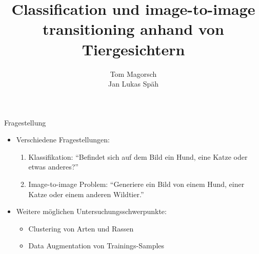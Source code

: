 \documentclass[aspectratio=1610, 9pt]{beamer}
\title{Classification und image-to-image transitioning anhand von Tiergesichtern}
\author[T.~Magorsch,~J.~L.~Späh]{Tom Magorsch\\ Jan Lukas Späh}
\institute[ML-Seminar]{\\[0.3cm]TU Dortmund \\ \Large ML-Seminar}
\begin{document}
\maketitle




\begin{frame}{Fragestellung}
\begin{itemize}
\item Verschiedene Fragestellungen:
\begin{enumerate}
\item Klassifikation: ``Befindet sich auf dem Bild ein Hund, eine Katze oder etwas anderes?''
\item Image-to-image Problem: ``Generiere ein Bild von einem Hund, einer Katze oder einem anderen Wildtier.''
\end{enumerate}
\item Weitere möglichen Untersuchungsschwerpunkte:
  \begin{itemize}
  \item Clustering von Arten und Rassen
  \item Data Augmentation von Trainings-Samples
  \end{itemize}
\end{itemize}



\end{frame}
\end{document}
